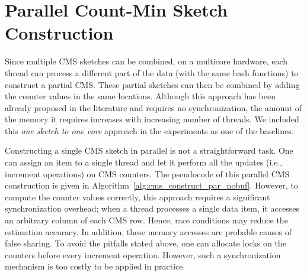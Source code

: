 \documentclass[runningheads]{llncs}
\begin{document}
\section{Parallel Count-Min Sketch Construction}\label{sec:par}

Since multiple CMS sketches can be combined, on a multicore hardware, each thread can process a different part of the data (with the same hash functions) to construct a partial CMS. These partial sketches can then be combined by adding the counter values in the same locations.
Although this approach has been already proposed in the literature and requires no synchronization,
the amount of the memory it requires increases with increasing number of threads. We included this {\em one sketch to one core} approach in the experiments as one of the baselines. 

Constructing a single CMS sketch in parallel is not a straightforward task. One can assign an item to a single thread and let it perform all the updates (i.e., increment operations) on CMS counters. The pseudocode of this parallel CMS construction is given in Algorithm~\ref{alg:cms_construct_par_nobuf}. However, to compute the counter values correctly, this approach requires a significant synchronization overhead; when a thread processes a single data item, it accesses an arbitrary column of each CMS row. Hence, race conditions may reduce the estimation accuracy. In addition, these memory accesses are probable causes of false sharing. 
To avoid the pitfalls stated above, one can allocate locks on the counters before every increment operation. However, such a   synchronization mechanism is too costly to be applied in practice. 
\end{document}
